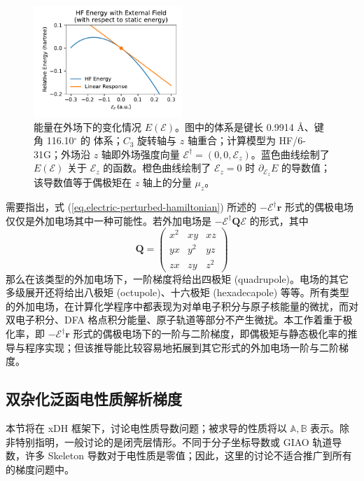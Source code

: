 \begin{figure}
  \centering
  \caption{能量在外场下的变化情况 $E(\pmb{\mathcal{E}})$。图中的体系是键长 0.9914 \AA、键角 116.10$^\circ$ 的  体系；$C_3$ 旋转轴与 $z$ 轴重合；计算模型为 HF/6-31G；外场沿 $z$ 轴即外场强度向量 $\pmb{\mathcal{E}}^\dagger = (0, 0, \mathcal{E}_z)$。蓝色曲线绘制了 $E(\pmb{\mathcal{E}})$ 关于 $\mathcal{E}_z$ 的函数。橙色曲线绘制了 $\mathcal{E}_z = 0$ 时 $\partial_{\mathcal{E}_z} E$ 的导数值；该导数值等于偶极矩在 $z$ 轴上的分量 $\mu_z$。}
  \label{fig.NumDipole-z}
  \includegraphics[width=0.5\textwidth]{assets/NumDipole-z.pdf}
\end{figure}

需要指出，式 (\ref{eq.electric-perturbed-hamiltonian}) 所述的 $- \pmb{\mathcal{E}}^\dagger \bm{r}$ 形式的偶极电场仅仅是外加电场其中一种可能性。若外加电场是 $- \pmb{\mathcal{E}}^\dagger \bm{Q} \pmb{\mathcal{E}}$ 的形式，其中
\begin{equation*}
  \bm{Q} =
  \begin{pmatrix}
    x^2 & xy & xz \\
    yx & y^2 & yz \\
    zx & zy & z^2
  \end{pmatrix}
\end{equation*}
那么在该类型的外加电场下，一阶梯度将给出四极矩 (quadrupole)。电场的其它多级展开还将给出八极矩 (octupole)、十六极矩 (hexadecapole) 等等。所有类型的外加电场，在计算化学程序中都表现为对单电子积分与原子核能量的微扰，而对双电子积分、DFA 格点积分能量、原子轨道等部分不产生微扰。本工作着重于极化率，即 $- \pmb{\mathcal{E}}^\dagger \bm{r}$ 形式的偶极电场下的一阶与二阶梯度，即偶极矩与静态极化率的推导与程序实现；但该推导能比较容易地拓展到其它形式的外加电场一阶与二阶梯度。

\subsection{双杂化泛函电性质解析梯度}
\label{sec.3.theory}

本节将在 xDH 框架下，讨论电性质导数问题；被求导的性质将以 $\mathbb{A}, \mathbb{B}$ 表示。除非特别指明，一般讨论的是闭壳层情形。不同于分子坐标导数或 GIAO 轨道导数，许多 Skeleton 导数对于电性质是零值；因此，这里的讨论不适合推广到所有的梯度问题中。

